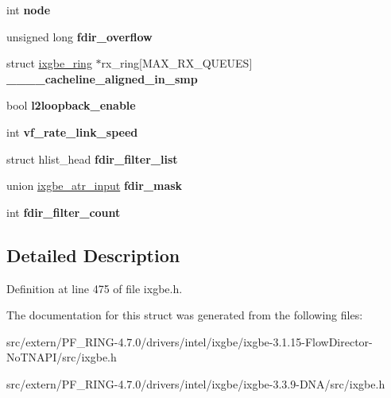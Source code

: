 \begin{DoxyCompactItemize}
\item 
\hypertarget{structixgbe__adapter_ab00d592041b4c436b2509055ca5f23a5}{
int {\bfseries node}}
\label{structixgbe__adapter_ab00d592041b4c436b2509055ca5f23a5}

\item 
\hypertarget{structixgbe__adapter_a77b0f4327afe910f191cd9b118fc0e01}{
unsigned long {\bfseries fdir\_\-overflow}}
\label{structixgbe__adapter_a77b0f4327afe910f191cd9b118fc0e01}

\item 
\hypertarget{structixgbe__adapter_adc29c9cff09e20f6fa03765e3d7b02d3}{
struct \hyperlink{structixgbe__ring}{ixgbe\_\-ring} $\ast$rx\_\-ring\mbox{[}MAX\_\-RX\_\-QUEUES\mbox{]} {\bfseries \_\-\_\-\_\-\_\-cacheline\_\-aligned\_\-in\_\-smp}}
\label{structixgbe__adapter_adc29c9cff09e20f6fa03765e3d7b02d3}

\item 
\hypertarget{structixgbe__adapter_a8a9a0902e47fb87ddd0bf069abd70df1}{
bool {\bfseries l2loopback\_\-enable}}
\label{structixgbe__adapter_a8a9a0902e47fb87ddd0bf069abd70df1}

\item 
\hypertarget{structixgbe__adapter_a0a3f577a87ec39ce80d65abe5dd88401}{
int {\bfseries vf\_\-rate\_\-link\_\-speed}}
\label{structixgbe__adapter_a0a3f577a87ec39ce80d65abe5dd88401}

\item 
\hypertarget{structixgbe__adapter_a7276b3e1e1fc2b7746fe0903320c9d8f}{
struct hlist\_\-head {\bfseries fdir\_\-filter\_\-list}}
\label{structixgbe__adapter_a7276b3e1e1fc2b7746fe0903320c9d8f}

\item 
\hypertarget{structixgbe__adapter_a6e33784cade52c2695c80ad2bb0cdc83}{
union \hyperlink{unionixgbe__atr__input}{ixgbe\_\-atr\_\-input} {\bfseries fdir\_\-mask}}
\label{structixgbe__adapter_a6e33784cade52c2695c80ad2bb0cdc83}

\item 
\hypertarget{structixgbe__adapter_ab4a33e8e4e3333b1f68f0a51ac6f1364}{
int {\bfseries fdir\_\-filter\_\-count}}
\label{structixgbe__adapter_ab4a33e8e4e3333b1f68f0a51ac6f1364}

\end{DoxyCompactItemize}


\subsection{Detailed Description}


Definition at line 475 of file ixgbe.h.



The documentation for this struct was generated from the following files:\begin{DoxyCompactItemize}
\item 
src/extern/PF\_\-RING-\/4.7.0/drivers/intel/ixgbe/ixgbe-\/3.1.15-\/FlowDirector-\/NoTNAPI/src/ixgbe.h\item 
src/extern/PF\_\-RING-\/4.7.0/drivers/intel/ixgbe/ixgbe-\/3.3.9-\/DNA/src/ixgbe.h\end{DoxyCompactItemize}
